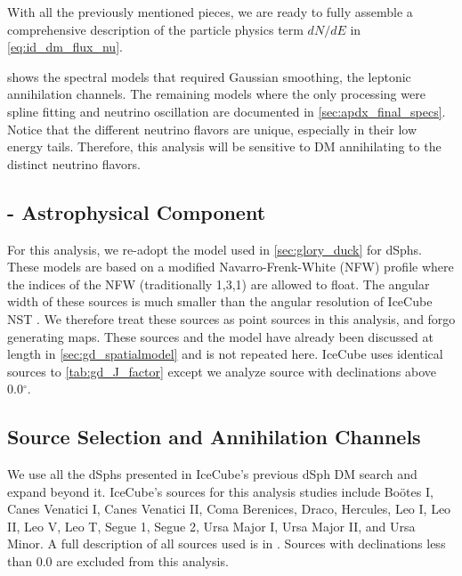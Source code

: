 With all the previously mentioned pieces, we are ready to fully assemble a comprehensive description of the particle physics term $dN/dE$ in \cref{eq:id_dm_flux_nu}.
\nuIDDMFlux

 shows the spectral models that required Gaussian smoothing, the leptonic annihilation channels.
The remaining models where the only processing were spline fitting and neutrino oscillation are documented in \cref{sec:apdx_final_specs}.
Notice that the different neutrino flavors are unique, especially in their low energy tails.
Therefore, this analysis will be sensitive to DM annihilating to the distinct neutrino flavors.

\subsection{\J - Astrophysical Component}\label{sec:icDM_spatialmodel}

For this analysis, we re-adopt the \GS model \cite{Geringer_Sameth_2015} used in \cref{sec:glory_duck} for dSphs.
These models are based on a modified Navarro-Frenk-White (NFW) profile where the indices of the NFW (traditionally 1,3,1) are allowed to float.
The angular width of these sources is much smaller than the angular resolution of IceCube NST \cite{IC_NGC1068}.
We therefore treat these sources as point sources in this analysis, and forgo generating maps.
These sources and the \GS model have already been discussed at length in \cref{sec:gd_spatialmodel} and is not repeated here.
IceCube uses identical sources to \cref{tab:gd_J_factor} except we analyze source with declinations above 0.0$^\circ$.

\subsection{Source Selection and Annihilation Channels}\label{sec:ic3_study_selection}

We use all the dSphs presented in IceCube's previous dSph DM search \cite{IC3_DM2013} and expand beyond it.
IceCube's sources for this analysis studies include Boötes I, Canes Venatici I, Canes Venatici II, Coma Berenices, Draco, Hercules, Leo I, Leo II, Leo V, Leo T, Segue 1, Segue 2, Ursa Major I, Ursa Major II,  and Ursa Minor.
A full description of all sources used is in .
Sources with declinations less than 0.0 are excluded from this analysis.

